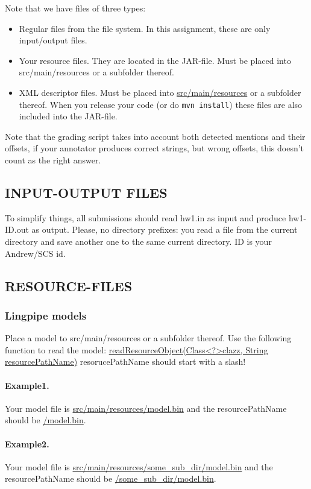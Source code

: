 Note that we have files of three types:
\begin{itemize}
\item Regular files from the file system. In this assignment, these are only input/output files.
\item Your resource files. They are located in the JAR-file. Must be placed into src/main/resources or a subfolder thereof.
\item XML descriptor files. Must be placed into \url{src/main/resources} or a subfolder thereof.
When you release your code (or do \texttt{mvn install}) these files are also included into the JAR-file.
\end{itemize}
 
Note that the grading script takes into account both detected mentions and their offsets, if your annotator produces correct strings, but wrong offsets, this doesn't count as the right answer.


\subsection*{INPUT-OUTPUT FILES}
To simplify things, all submissions should read hw1.in as input and produce hw1-ID.out as output. Please, no directory prefixes: you read a file from the current directory and save another one to the same current directory. ID is your Andrew/SCS id. 

\subsection*{RESOURCE-FILES}
\subsubsection*{Lingpipe models}

Place a model to src/main/resources or a subfolder thereof. Use the following function to read the model:
\href{http://alias-i.com/lingpipe/docs/api/com/aliasi/util/AbstractExternalizable.html#readResourceObject%28java.lang.Class,%20java.lang.String%29}{readResourceObject(Class\textless ?\textgreater clazz, String resourcePathName)}
resorucePathName should start with a slash! 
 
\paragraph{Example1.} Your model file is \url{src/main/resources/model.bin} and the resourcePathName should be \url{/model.bin}. 
\paragraph{Example2.} Your model file is \url{src/main/resources/some_sub_dir/model.bin} and the resourcePathName should be \url{/some_sub_dir/model.bin}.

